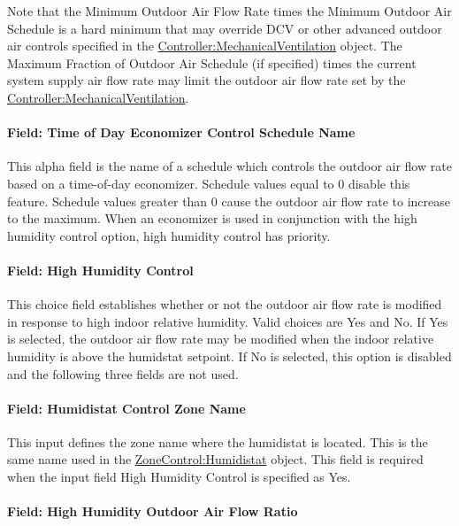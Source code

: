 Note that the Minimum Outdoor Air Flow Rate times the Minimum Outdoor Air Schedule is a hard minimum that may override DCV or other advanced outdoor air controls specified in the \hyperref[controllermechanicalventilation]{Controller:MechanicalVentilation} object.  The Maximum Fraction of Outdoor Air Schedule (if specified) times the current system supply air flow rate may limit the outdoor air flow rate set by the \hyperref[controllermechanicalventilation]{Controller:MechanicalVentilation}.

\paragraph{Field: Time of Day Economizer Control Schedule Name}\label{field-time-of-day-economizer-control-schedule-name}

This alpha field is the name of a schedule which controls the outdoor air flow rate based on a time-of-day economizer. Schedule values equal to 0 disable this feature. Schedule values greater than 0 cause the outdoor air flow rate to increase to the maximum. When an economizer is used in conjunction with the high humidity control option, high humidity control has priority.

\paragraph{Field: High Humidity Control}\label{field-high-humidity-control}

This choice field establishes whether or not the outdoor air flow rate is modified in response to high indoor relative humidity. Valid choices are Yes and No. If Yes is selected, the outdoor air flow rate may be modified when the indoor relative humidity is above the humidstat setpoint. If No is selected, this option is disabled and the following three fields are not used.

\paragraph{Field: Humidistat Control Zone Name}\label{field-humidistat-control-zone-name}

This input defines the zone name where the humidistat is located. This is the same name used in the \hyperref[zonecontrolhumidistat]{ZoneControl:Humidistat} object. This field is required when the input field High Humidity Control is specified as Yes.

\paragraph{Field: High Humidity Outdoor Air Flow Ratio}\label{field-high-humidity-outdoor-air-flow-ratio}

